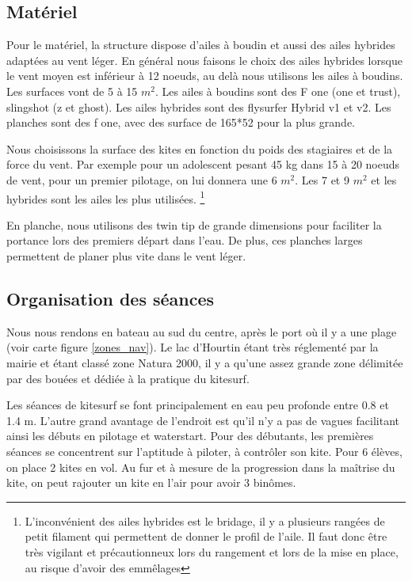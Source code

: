 \documentclass[11pt,a4paper]{report}
\begin{document}
\FloatBarrier
\subsection{Matériel}
Pour le matériel, la structure dispose d'ailes à boudin et aussi 
des ailes hybrides adaptées au vent léger. En général nous faisons
le choix des ailes hybrides lorsque le vent moyen est inférieur à
12 noeuds, au delà nous utilisons les ailes à boudins. Les
surfaces vont de 5 à 15 $m^2$. 
Les ailes à boudins sont des F one (one et trust), slingshot (z et ghost).
Les ailes hybrides sont des flysurfer Hybrid v1 et v2.
Les planches sont des f one, avec des surface de 165*52 pour la plus grande.

Nous choisissons la surface des kites
en fonction du poids des stagiaires et de la force du vent.
Par exemple pour un adolescent pesant 45 kg dans 15 à 20 noeuds
de vent, pour un premier pilotage, on lui donnera une 6 $m^2$.
Les 7 et 9 $m^2$ et les hybrides sont les ailes les plus utilisées.
\footnote{L'inconvénient des ailes hybrides est le bridage, il y a plusieurs rangées de petit filament qui permettent
de donner le profil de l'aile. Il faut donc \^etre très vigilant et précautionneux
lors du rangement et lors de la mise en place, au risque d'avoir des emm\^elages}

En planche, nous utilisons des twin tip de grande dimensions 
pour faciliter la portance lors des premiers départ dans l'eau.
De plus, ces planches larges permettent de planer plus vite
dans le vent léger.

\subsection{Organisation des séances}
Nous nous rendons en bateau au sud du centre, après le port o\`u
il y a une plage (voir carte figure \ref{zones_nav}). Le lac 
d'Hourtin étant très réglementé par la mairie et étant classé
zone Natura 2000\cite{natura2000}, 
il y a qu'une assez grande zone délimitée par des bouées et 
dédiée à la pratique du kitesurf.

Les séances de kitesurf se font principalement en eau peu profonde
entre 0.8 et 1.4 m. L'autre grand avantage de l'endroit est
qu'il n'y a pas de vagues facilitant ainsi les débuts en pilotage
et waterstart.
Pour des débutants, les premières séances se concentrent sur l'aptitude
à piloter, à contrôler son kite. Pour 6 élèves, on place 2 kites en vol.
Au fur et à mesure de la progression dans la ma\^itrise du kite, 
on peut rajouter un kite en l'air pour avoir 3 bin\^omes.
\end{document}
